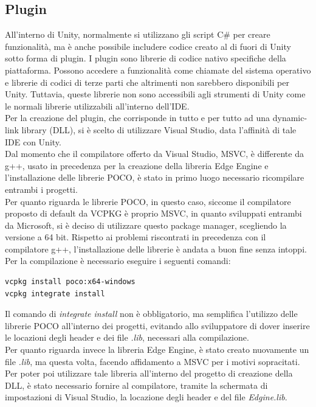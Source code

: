\subsection{Plugin}
All'interno di Unity, normalmente si utilizzano gli script C\# per creare funzionalità, ma è anche possibile includere codice creato al di fuori di Unity sotto forma di plugin. I plugin sono librerie di codice nativo specifiche della piattaforma. Possono accedere a funzionalità come chiamate del sistema operativo e librerie di codici di terze parti che altrimenti non sarebbero disponibili per Unity. Tuttavia, queste librerie non sono accessibili agli strumenti di Unity come le normali librerie utilizzabili all'interno dell’IDE. \\
Per la creazione del plugin, che corrisponde in tutto e per tutto ad una dynamic-link library (DLL), si è scelto di utilizzare Visual Studio, data l'affinità di tale IDE con Unity.\\
Dal momento che il compilatore offerto da Visual Studio, MSVC, è differente da g++, usato in precedenza per la creazione della libreria Edge Engine e l’installazione delle librerie POCO, è stato in primo luogo necessario ricompilare entrambi i progetti.\\
Per quanto riguarda le librerie POCO, in questo caso, siccome il compilatore proposto di default da VCPKG è proprio MSVC, in quanto sviluppati entrambi da Microsoft, si è deciso di utilizzare questo package manager, scegliendo la versione a 64 bit. Rispetto ai problemi riscontrati in precedenza con il compilatore g++, l’installazione delle librerie è andata a buon fine senza intoppi. Per la compilazione è necessario eseguire i seguenti comandi:
\begin{verbatim}
vcpkg install poco:x64-windows
vcpkg integrate install
\end{verbatim}
Il comando di \textit{integrate install} non è obbligatorio, ma semplifica l'utilizzo delle librerie POCO all'interno dei progetti, evitando allo sviluppatore di dover inserire le locazioni degli header e dei file \textit{.lib}, necessari alla compilazione.\\
Per quanto riguarda invece la libreria Edge Engine, è stato creato nuovamente un file \textit{.lib}, ma questa volta, facendo affidamento a MSVC per i motivi sopracitati. Per poter poi utilizzare tale libreria all'interno del progetto di creazione della DLL, è stato necessario fornire al compilatore, tramite la schermata di impostazioni di Visual Studio, la locazione degli header e del file \textit{Edgine.lib}.\\
